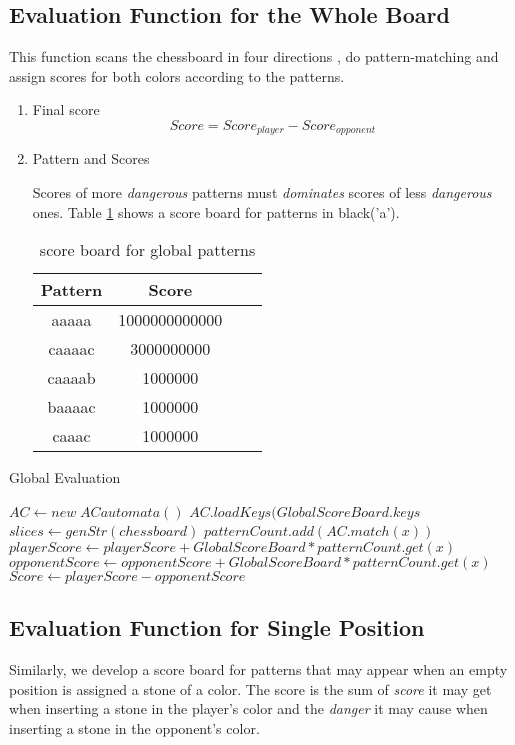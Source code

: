 \documentclass[conference]{IEEEtran}
\begin{document}
\subsection{Evaluation Function for the Whole Board}
This function scans the chessboard in four directions , do pattern-matching and assign scores for both colors according to the patterns. 
\begin{enumerate}
	\item Final score 
	$$ Score = Score_{player} - Score_{opponent}$$
	\item Pattern and Scores
	
	Scores of more \emph{dangerous} patterns must \emph{dominates} scores of less \emph{dangerous} ones. Table \ref{table:1} shows a score board for patterns in black('a').

	\begin{table}[htb]
	\caption{score board for global patterns}
	\centering
    \begin{tabular}{cccc}
    \toprule
    Pattern&Score\\
    \midrule
	aaaaa&1000000000000\\
	caaaac&3000000000\\
	caaaab&1000000\\
	baaaac&1000000\\
	caaac&1000000\\
	\bottomrule
	\end{tabular}
	\label{table:1}
	\end{table}
\end{enumerate}

\begin{algorithm}
    \caption{Global Evaluation}
\begin{algorithmic}[1]
    \State $AC \gets new\; ACautomata()$
    \State $AC.loadKeys(GlobalScoreBoard.keys$
    \State $slices \gets genStr(chessboard)$
        \State $patternCount.add(AC.match(x))$
    \EndFor
        \State $playerScore \gets playerScore + GlobalScoreBoard*patternCount.get(x)$
        \Else
        \State $opponentScore \gets opponentScore + Global ScoreBoard*patternCount.get(x)$
        \EndIf
    \EndFor
    \State $Score \gets playerScore - opponentScore$
\end{algorithmic}
\end{algorithm}
\subsection{Evaluation Function for Single Position}
Similarly, we develop a score board for patterns that may appear when an empty position is assigned a stone of a color. The score is the sum of \emph{score} it may get when inserting a stone in the player's color and the \emph{danger} it may cause when inserting a stone in the opponent's color.
\end{document}
